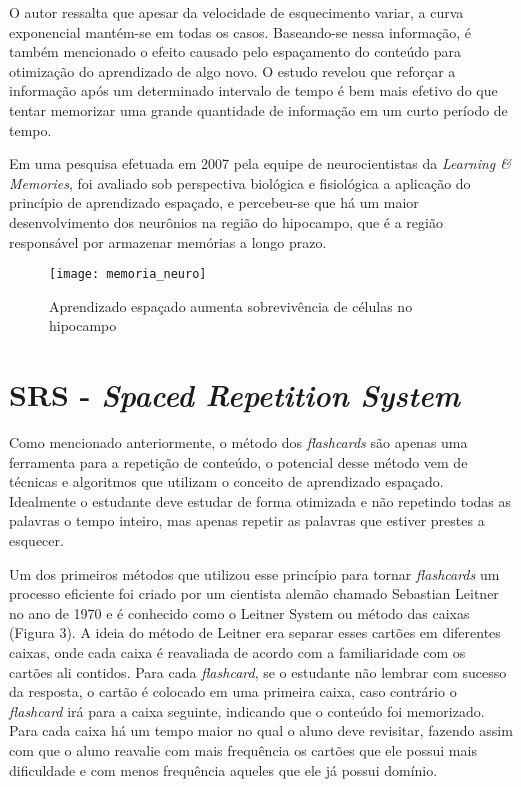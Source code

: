 O autor ressalta que apesar da velocidade de esquecimento variar, a curva exponencial mantém-se em todas os casos. Baseando-se nessa informação, é também mencionado o efeito causado pelo espaçamento do conteúdo para otimização do aprendizado de algo novo. O estudo revelou que reforçar a informação após um determinado intervalo de tempo é bem mais efetivo do que tentar memorizar uma grande quantidade de informação em um curto período de tempo. 

Em uma pesquisa efetuada em 2007 pela equipe de neurocientistas da \textit{Learning \& Memories}, foi avaliado sob perspectiva biológica e fisiológica a aplicação do princípio de aprendizado espaçado, e percebeu-se que há um maior desenvolvimento dos neurônios na região do hipocampo, que é a região responsável por armazenar memórias a longo prazo.

\begin{figure}[H]
	\caption{\label{fig:memoria_neuro}Aprendizado espaçado aumenta sobrevivência de células no hipocampo}
\begin{center}
	\texttt{[image: memoria\_neuro]}
\end{center}
\end{figure}

\section{SRS - \textit{Spaced Repetition System}}
Como mencionado anteriormente, o método dos \textit{flashcards} são apenas uma ferramenta para a repetição de conteúdo, o potencial desse método vem de técnicas e algoritmos que utilizam o conceito de aprendizado espaçado. Idealmente o estudante deve estudar de forma otimizada e não repetindo todas as palavras o tempo inteiro, mas apenas repetir as palavras que estiver prestes a esquecer.

Um dos primeiros métodos que utilizou esse princípio para tornar \textit{flashcards} um processo eficiente foi criado por um cientista alemão chamado Sebastian Leitner no ano de 1970 e é conhecido como o Leitner System ou método das caixas (Figura 3). A ideia do método de Leitner era separar esses cartões em diferentes caixas, onde cada caixa é reavaliada de acordo com a familiaridade com os cartões ali contidos. Para cada \textit{flashcard}, se o estudante não lembrar com sucesso da resposta, o cartão é colocado em uma primeira caixa, caso contrário o \textit{flashcard} irá para a caixa seguinte, indicando que o conteúdo foi memorizado. Para cada caixa há um tempo maior no qual o aluno deve revisitar, fazendo assim com que o aluno reavalie com mais frequência os cartões que ele possui mais dificuldade e com menos frequência aqueles que ele já possui domínio.

